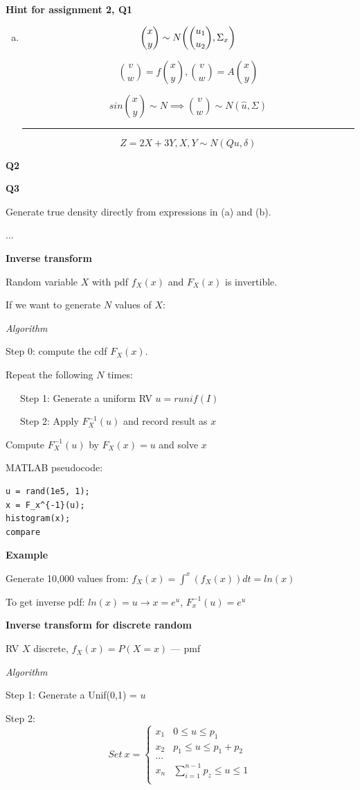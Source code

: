 \documentclass{report}
\newcommand{\ex}{\noindent\rule{\linewidth}{0.2pt}}
\DeclarePairedDelimiter\autobracket{(}{)}
\newcommand{\br}[1]{\autobracket*{#1}}
\begin{document}
\textbf{Hint for assignment 2, Q1}

\begin{enumerate}[(a)]
\item $${x \choose y} \sim N \br{ {u_1 \choose u_2}, \Sigma_x }$$

$${v \choose w} = f  {x \choose y} , {v \choose w} = A {x \choose y}$$

$$sin {x \choose y} \sim N  \implies {v \choose w} \sim N (\hat{u},  \Sigma )  $$

\ex
 
$$ Z = 2X + 3Y, X,Y \sim N(Q u, \delta)$$
\end{enumerate}

\textbf{Q2}

\textbf{Q3}

Generate true density directly from expressions in (a) and (b).

...

\textbf{Inverse transform}

Random variable $X$ with pdf $f_X(x)$ and $F_X(x)$ is invertible.

If we want to generate $N$ values of $X$:

\textit{Algorithm}

Step 0: compute the cdf $F_X(x)$.

Repeat the following $N$ times:

\ \ \ Step 1: Generate a uniform RV $u=runif(I)$

\ \ \ Step 2: Apply $F_X^{-1}(u)$ and record result as $x$

Compute $F_X^{-1}(u)$ by $F_X(x)=u$ and solve $x$

MATLAB pseudocode:

\begin{verbatim}
u = rand(1e5, 1);
x = F_x^{-1}(u);
histogram(x);
compare
\end{verbatim}


\textbf{Example}

Generate 10,000 values from: $f_X(x) = \int^x(f_X(x)) dt = ln(x)$

To get inverse pdf: $ln(x) = u \rightarrow x = e^u$, 
$F_x^{-1}(u) = e^u$

\textbf{Inverse transform for discrete random}

RV $X$ discrete, $f_X(x) = P(X =x)$ --- pmf

\textit{Algorithm}

Step 1: Generate a Unif(0,1) = $u$

Step 2: $$Set\ x = \begin{cases} 
x_1 & 0 \leq u \leq p_1 \\
x_2 & p_1 \leq u \leq p_1 + p_2 \\
...\\
x_n & \sum_{i=1}^{n-1} p_z \leq u \leq 1 \\
\end{cases}$$
\end{document}
